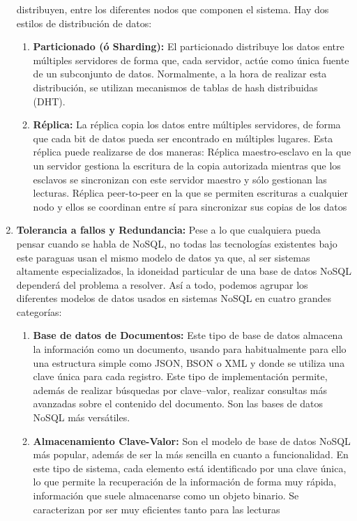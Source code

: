 \begin{enumerate}
distribuyen, entre los diferentes nodos que componen el sistema. 
Hay dos estilos de distribución de datos:
\begin{enumerate}
\item \textbf{Particionado (ó Sharding):} El particionado distribuye 
los datos entre múltiples servidores de forma que, cada servidor,
 actúe como única fuente de un subconjunto de datos. Normalmente, 
a la hora de realizar esta distribución, se utilizan mecanismos de tablas
 de hash distribuidas (DHT). 
\item \textbf{Réplica:} La réplica copia los datos entre múltiples 
servidores, de forma que cada bit de datos pueda ser encontrado 
en múltiples lugares. Esta réplica puede realizarse de dos maneras:
Réplica maestro-esclavo en la que un servidor gestiona la escritura
 de la copia autorizada mientras que los esclavos se sincronizan con
 este servidor maestro y sólo gestionan las lecturas.
Réplica peer-to-peer en la que se permiten escrituras a cualquier nodo 
y ellos se coordinan entre sí para sincronizar sus copias de los datos
\end{enumerate}
\item \textbf{Tolerancia a fallos y Redundancia: } Pese a lo que 
cualquiera pueda pensar cuando se habla de NoSQL, no todas las 
tecnologías existentes bajo este paraguas usan el mismo modelo de
 datos ya que, al ser sistemas altamente especializados, la idoneidad 
particular de una base de datos NoSQL dependerá del problema
 a resolver. Así a todo, podemos agrupar los diferentes modelos de
 datos usados en sistemas NoSQL en cuatro grandes categorías:
\begin{enumerate}
\item \textbf{Base de datos de Documentos: } Este tipo de base 
de datos almacena la información como un documento, usando para
 habitualmente para ello una estructura simple como JSON, BSON o XML
 y donde se utiliza una clave única para cada registro. Este tipo de
 implementación permite, además de realizar búsquedas por clave–valor,
 realizar consultas más avanzadas sobre el contenido del documento.
 Son las bases de datos NoSQL más versátiles.
\item \textbf{Almacenamiento Clave-Valor:} Son el modelo de base de
 datos NoSQL más popular, además de ser la más sencilla en cuanto a 
funcionalidad. En este tipo de sistema, cada elemento está identificado 
por una clave única, lo que permite la recuperación de la información de
 forma muy rápida, información que suele almacenarse como un objeto
 binario. Se caracterizan por ser muy eficientes tanto para las lecturas

\end{enumerate}
\end{enumerate}
